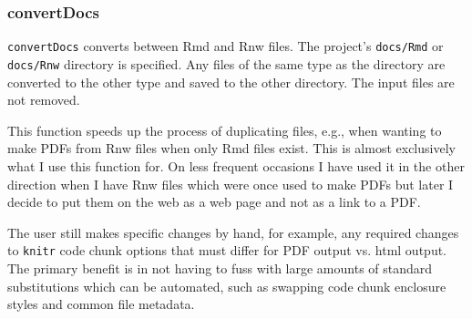 \documentclass{article}\usepackage[]{graphicx}\usepackage[]{color}
\begin{document}
\subsubsection{convertDocs}
\texttt{convertDocs} converts between Rmd and Rnw files.
The project's \texttt{docs/Rmd} or \texttt{docs/Rnw} directory is specified.
Any files of the same type as the directory are converted to the other type and saved to the other directory.
The input files are not removed.

This function speeds up the process of duplicating files, e.g., when wanting to make PDFs from Rnw files when only Rmd files exist.
This is almost exclusively what I use this function for.
On less frequent occasions I have used it in the other direction when I have Rnw files which were once used to make PDFs but later I decide to put them on the web as a web page and not as a link to a PDF.

The user still makes specific changes by hand, for example, any required changes to \texttt{knitr} code chunk options that must differ for PDF output vs. html output.
The primary benefit is in not having to fuss with large amounts of standard substitutions which can be automated, such as swapping code chunk enclosure styles and common file metadata.
\end{document}
